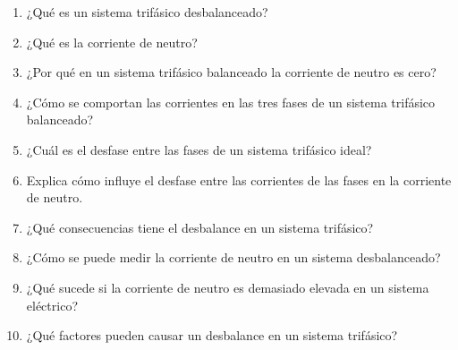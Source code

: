 \documentclass[../main]{subfiles}
\begin{document}
\newpage

\begin{enumerate}
  \item ¿Qué es un sistema trifásico desbalanceado?
  \item ¿Qué es la corriente de neutro?
  \item ¿Por qué en un sistema trifásico balanceado la corriente de
    neutro es cero?
  \item ¿Cómo se comportan las corrientes en las tres fases de un
    sistema trifásico balanceado?
  \item ¿Cuál es el desfase entre las fases de un sistema trifásico ideal?
  \item Explica cómo influye el desfase entre las corrientes de las
    fases en la corriente de neutro.
  \item ¿Qué consecuencias tiene el desbalance en un sistema trifásico?
  \item ¿Cómo se puede medir la corriente de neutro en un sistema desbalanceado?
  \item ¿Qué sucede si la corriente de neutro es demasiado elevada en
    un sistema eléctrico?
  \item ¿Qué factores pueden causar un desbalance en un sistema trifásico?
\end{enumerate}

\end{document}

